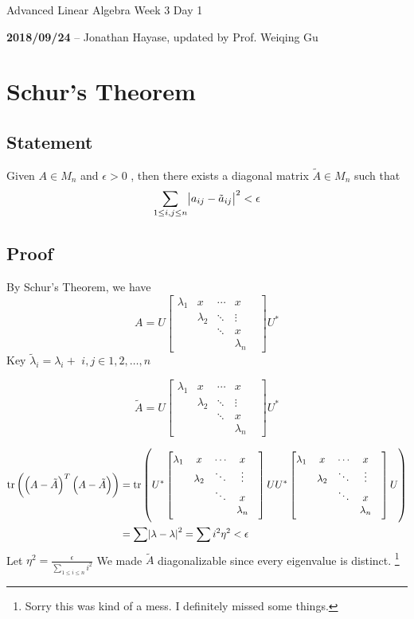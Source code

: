 \documentclass{article}
\DeclareMathOperator{\trace}{tr}
\newcommand{\m}[1]{\begin{bmatrix} #1 \end{bmatrix}}
\begin{document}
\begin{center}
  \Large Advanced Linear Algebra Week 3 Day 1
  \normalsize

  \textbf{2018/09/24} -- Jonathan Hayase, updated by Prof. Weiqing Gu
\end{center}

\section{Schur's Theorem}
\subsection{Statement}
Given \(A \in M_n\) and \(\epsilon > 0\) , then there exists a diagonal matrix \(\tilde{A} \in M_n\) such that
\[\sum_{1 \leq i, j \leq n} \abs{a_{ij} - \tilde{a}_{ij}}^2 < \epsilon\]

\subsection{Proof}
By Schur's Theorem, we have
\[A = U\m{\lambda_1 &x&\cdots&x &\\&\lambda_2&\ddots& \vdots \\& &\ddots &x\\&&&\lambda_n}U^*\]
Key \(\tilde{\lambda}_i = \lambda_i + \) \(i, j \in 1, 2, \dots, n\)

\[\tilde A = U\m{\lambda_1 &x&\cdots&x &\\&\lambda_2&\ddots& \vdots \\& &\ddots &x\\&&&\lambda_n}U^*\]

\begin{align*}
  \trace \del{\del{A - \tilde A}^T\del{A - \tilde A}}
  &= \trace\del{U^*\m{\lambda_1 &x&\cdots&x &\\&\lambda_2&\ddots& \vdots \\& &\ddots &x\\&&&\lambda_n}UU^*\m{\lambda_1 &x&\cdots&x &\\&\lambda_2&\ddots& \vdots \\& &\ddots &x\\&&&\lambda_n}U}\\
  &= \sum\abs{\lambda - \lambda}^2 = \sum i^2\eta^2 < \epsilon
\end{align*}
Let \(\eta^2 = \frac{\epsilon}{\sum_{1 \leq i \leq n} i^2}\)
We made \(\tilde A\) diagonalizable since every eigenvalue is distinct.
\footnote{Sorry this was kind of a mess. I definitely missed some things.}
\end{document}
